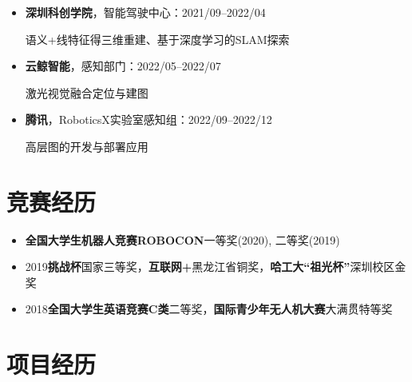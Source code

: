 \documentclass[11pt,a4paper,sans]{moderncv}        %
\begin{document}
\begin{itemize}

\item{\textbf{深圳科创学院}，智能驾驶中心：2021/09--2022/04}

语义+线特征得三维重建、基于深度学习的SLAM探索

\item{\textbf{云鲸智能}，感知部门：2022/05--2022/07}

激光视觉融合定位与建图

\item{\textbf{腾讯}，RoboticsX实验室感知组：2022/09--2022/12}

高层图的开发与部署应用

\end{itemize}


\section{竞赛经历}

\begin{itemize}
    \item{\textbf{全国大学生机器人竞赛ROBOCON}一等奖(2020), 二等奖(2019)}

    \item{2019\textbf{挑战杯}国家三等奖，\textbf{互联网+}黑龙江省铜奖，\textbf{哈工大“祖光杯”}深圳校区金奖}

    \item{2018\textbf{全国大学生英语竞赛C类}二等奖，\textbf{国际青少年无人机大赛}大满贯特等奖}
\end{itemize}

\section{项目经历}
\end{document}
